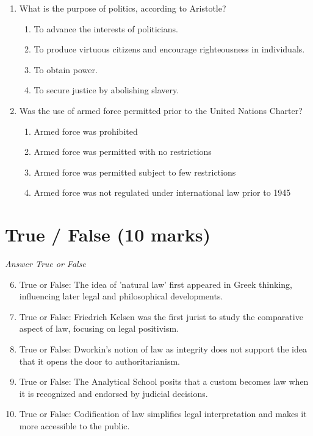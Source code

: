 \documentclass[12pt]{article}
\begin{document}
\begin{enumerate}[label=\arabic*.]
\item What is the purpose of politics, according to Aristotle?
\begin{enumerate}[label=(\alph*)]
    \item To advance the interests of politicians.
    \item To produce virtuous citizens and encourage righteousness in individuals.
    \item To obtain power.
    \item To secure justice by abolishing slavery.
\end{enumerate}
\item Was the use of armed force permitted prior to the United Nations Charter?
\begin{enumerate}[label=(\alph*)]
    \item Armed force was prohibited
    \item Armed force was permitted with no restrictions
    \item Armed force was permitted subject to few restrictions
    \item Armed force was not regulated under international law prior to 1945
\end{enumerate}
\end{enumerate}

\section*{True / False (10 marks)}
\textit{Answer True or False}
\begin{enumerate}[label=\arabic*.]
\setcounter{enumi}{5}
\item True or False: The idea of 'natural law' first appeared in Greek thinking, influencing later legal and philosophical developments.
\item True or False: Friedrich Kelsen was the first jurist to study the comparative aspect of law, focusing on legal positivism.
\item True or False: Dworkin's notion of law as integrity does not support the idea that it opens the door to authoritarianism.
\item True or False: The Analytical School posits that a custom becomes law when it is recognized and endorsed by judicial decisions.
\item True or False: Codification of law simplifies legal interpretation and makes it more accessible to the public.
\end{enumerate}
\end{document}
